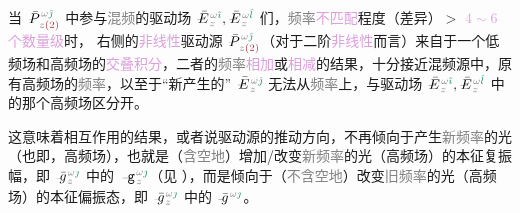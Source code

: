 当 $\xint{\mathcolor{gray}{-}}{25}{\bar{P}}^{\;\! \mathcolor{gray}{\omega} \textcolor{PineGreen}{\hat{\jmath}}}_{\;\! \mathcolor{gray}{z} \textcolor{Maroon}{(2)}}$ 中参与\textcolor{gray}{混频}的\textcolor{NavyBlue}{驱动场} $\xint{\mathcolor{gray}{-}}{25}{\bar{E}}^{\;\! \mathcolor{gray}{\omega} \textcolor{PineGreen}{\hat{\imath}}}_{\;\! \mathcolor{gray}{z}}, \xint{\mathcolor{gray}{-}}{25}{\bar{E}}^{\;\! \mathcolor{gray}{\omega} \textcolor{PineGreen}{\hat{l}}}_{\;\! \mathcolor{gray}{z}}$ 们，\textcolor{gray}{频率}\textcolor{Plum}{不匹配}程度（差异）$>$ \textcolor{Plum}{$4 \sim 6$ 个数量级}时， 右侧的\textcolor{Plum}{非线性}\textcolor{NavyBlue}{驱动源} $\xint{\mathcolor{gray}{-}}{25}{\bar{P}}^{\;\! \mathcolor{gray}{\omega} \textcolor{PineGreen}{\hat{\jmath}}}_{\;\! \mathcolor{gray}{z} \textcolor{Maroon}{(2)}}$（对于二阶\textcolor{Plum}{非线性}而言）来自于一个\textcolor{NavyBlue}{低频场}和\textcolor{NavyBlue}{高频场}的\textcolor{Plum}{交叠积分}，二者的\textcolor{gray}{频率}\textcolor{Plum}{相加}或\textcolor{Plum}{相减}的结果，十分接近\textcolor{NavyBlue}{混频源}中，原有\textcolor{NavyBlue}{高频场}的\textcolor{gray}{频率}，以至于“新产生的” $\xint{\mathcolor{gray}{-}}{25}{\bar{E}}^{\;\! \mathcolor{gray}{\omega} \textcolor{PineGreen}{\hat{\jmath}}}_{\;\! \mathcolor{gray}{z}}$ 无法从\textcolor{gray}{频率}上，与\textcolor{NavyBlue}{驱动场} $\xint{\mathcolor{gray}{-}}{25}{\bar{E}}^{\;\! \mathcolor{gray}{\omega} \textcolor{PineGreen}{\hat{\imath}}}_{\;\! \mathcolor{gray}{z}}, \xint{\mathcolor{gray}{-}}{25}{\bar{E}}^{\;\! \mathcolor{gray}{\omega} \textcolor{PineGreen}{\hat{l}}}_{\;\! \mathcolor{gray}{z}}$ 中的那个\textcolor{NavyBlue}{高频场}区分开。

这意味着相互作用的结果，或者说\textcolor{NavyBlue}{驱动源}的推动方向，不再倾向于产生\textcolor{gray}{新频率}的光（也即，\textcolor{NavyBlue}{高频场}），也就是（\textcolor{gray}{含空地}）增加/改变\textcolor{gray}{新频率}的光（\textcolor{NavyBlue}{高频场}）的\textcolor{PineGreen}{本征复振幅}，即 $\xint{{}^{}_{\mathcolor{gray}{-}}}{10}{\bar{g}}^{\;\!\mathcolor{gray}{\omega} \textcolor{PineGreen}{\jmath}}_{\;\! \mathcolor{gray}{z}}$ 中的 $\xint{\begin{smallmatrix} ~ \\ {}^{}_{\mathcolor{gray}{-}} \\ ~ \end{smallmatrix}}{09}{\mathtt{g}}^{\;\!\mathcolor{gray}{\omega} \textcolor{PineGreen}{\jmath}}_{\;\! \mathcolor{gray}{z}}$（见 ），而是倾向于（\textcolor{gray}{不含空地}）改变\textcolor{gray}{旧频率}的光（\textcolor{NavyBlue}{高频场}）的\textcolor{PineGreen}{本征偏振态}，即 $\xint{{}^{}_{\mathcolor{gray}{-}}}{10}{\bar{g}}^{\;\!\mathcolor{gray}{\omega} \textcolor{PineGreen}{\jmath}}_{\;\! \mathcolor{gray}{z}}$ 中的 $\xint{{}^{}_{\mathcolor{gray}{-}}}{10}{\bar{g}}^{\;\!\mathcolor{gray}{\omega} \textcolor{PineGreen}{\jmath}}$。 

